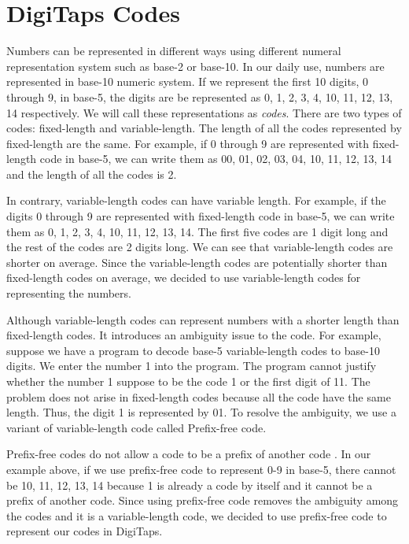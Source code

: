 \section{DigiTaps Codes}
\label{sec:codes}

Numbers can be represented in different ways using different numeral representation system such as base-2 or base-10. In our daily use, numbers are represented in base-10 numeric system. If we represent the first 10 digits, 0 through 9, in base-5, the digits  are be represented as 0, 1, 2, 3, 4, 10, 11, 12, 13, 14 respectively. We will call these representations as \textit{codes}. There are two types of codes: fixed-length and variable-length. The length of all the codes represented by fixed-length are the same. For example, if 0 through 9 are represented with fixed-length code in base-5, we can write them as 00, 01, 02, 03, 04, 10, 11, 12, 13, 14 and the length of all the codes is 2.
\par
In contrary, variable-length codes can have variable length. For example, if the digits 0 through 9 are represented with fixed-length code in base-5, we can write them as 0, 1, 2, 3, 4, 10, 11, 12, 13, 14. The first five codes are 1 digit long and the rest of the codes are 2 digits long. We can see that variable-length codes are shorter on average. Since the variable-length codes are potentially shorter than fixed-length codes on average, we decided to use variable-length codes for representing the numbers.
\par
Although variable-length codes can represent numbers with a shorter length than fixed-length codes. It introduces an ambiguity issue to the code. For example, suppose we have a program to decode base-5 variable-length codes to base-10 digits. We enter the number 1 into the program. The program cannot justify whether the number 1 suppose to be the code 1 or the first digit of 11. The problem does not arise in fixed-length codes because all the code have the same length. Thus, the digit 1 is represented by 01. To resolve the ambiguity, we use a variant of variable-length code called Prefix-free code. 
\par
Prefix-free codes do not allow a code to be a prefix of another code \cite{huf52}. In our example above, if we use prefix-free code to represent 0-9 in base-5, there cannot be 10, 11, 12, 13, 14 because 1 is already a code by itself and it cannot be a prefix of another code. Since using prefix-free code removes the ambiguity among the codes and it is a variable-length code, we decided to use prefix-free code to represent our codes in DigiTaps.

